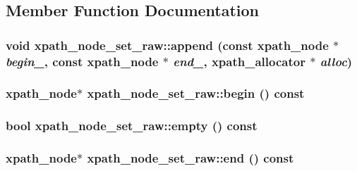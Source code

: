 \subsection{Member Function Documentation}
\hypertarget{classxpath__node__set__raw_a0c02728de3d895a2d12df9666d60e414}{
\subsubsection[{append}]{\setlength{\rightskip}{0pt plus 5cm}void xpath\_\-node\_\-set\_\-raw::append (const xpath\_\-node $\ast$ {\em begin\_\-}, \/  const xpath\_\-node $\ast$ {\em end\_\-}, \/  {\bf xpath\_\-allocator} $\ast$ {\em alloc})}}
\label{classxpath__node__set__raw_a0c02728de3d895a2d12df9666d60e414}
\hypertarget{classxpath__node__set__raw_a8d08142ac662315aa23395a44f301b66}{
\subsubsection[{begin}]{\setlength{\rightskip}{0pt plus 5cm}xpath\_\-node$\ast$ xpath\_\-node\_\-set\_\-raw::begin () const}}
\label{classxpath__node__set__raw_a8d08142ac662315aa23395a44f301b66}
\hypertarget{classxpath__node__set__raw_affb19c256fef52cc4d34e59a9ac0c2b6}{
\subsubsection[{empty}]{\setlength{\rightskip}{0pt plus 5cm}bool xpath\_\-node\_\-set\_\-raw::empty () const}}
\label{classxpath__node__set__raw_affb19c256fef52cc4d34e59a9ac0c2b6}
\hypertarget{classxpath__node__set__raw_a6be07e8a83744082cf106d4611da0164}{
\subsubsection[{end}]{\setlength{\rightskip}{0pt plus 5cm}xpath\_\-node$\ast$ xpath\_\-node\_\-set\_\-raw::end () const}}
